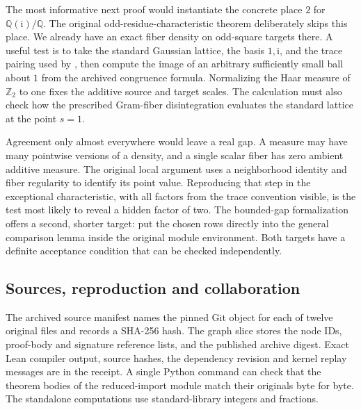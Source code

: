 \documentclass[12pt,letterpaper]{article}
\newcommand{\code}[1]{\texttt{\detokenize{#1}}}
\begin{document}
The most informative next proof would instantiate the concrete place \(2\) for \(\mathbb Q(\mathrm i)/\mathbb Q\). The original odd-residue-characteristic theorem deliberately skips this place. We already have an exact fiber density on odd-square targets there. A useful test is to take the standard Gaussian lattice, the basis \(1,\mathrm i\), and the trace pairing used by \code{coordHerm}, then compute the image of an arbitrary sufficiently small ball about \(1\) from the archived congruence formula. Normalizing the Haar measure of \(\mathbb Z_2\) to one fixes the additive source and target scales. The calculation must also check how the prescribed Gram-fiber disintegration evaluates the standard lattice at the point \(s=1\).

Agreement only almost everywhere would leave a real gap. A measure may have many pointwise versions of a density, and a single scalar fiber has zero ambient additive measure. The original local argument uses a neighborhood identity and fiber regularity to identify its point value. Reproducing that step in the exceptional characteristic, with all factors from the trace convention visible, is the test most likely to reveal a hidden factor of two. The bounded-gap formalization offers a second, shorter target: put the chosen rows directly into the general comparison lemma inside the original module environment. Both targets have a definite acceptance condition that can be checked independently.

\clearpage\subsection*{Sources, reproduction and collaboration}\label{collab}
The archived source manifest names the pinned Git object for each of twelve original files and records a SHA-256 hash. The graph slice stores the node IDs, proof-body and signature reference lists, and the published archive digest. Exact Lean compiler output, source hashes, the dependency revision and kernel replay messages are in the receipt. A single Python command can check that the theorem bodies of the reduced-import module match their originals byte for byte. The standalone computations use standard-library integers and fractions.
\end{document}
